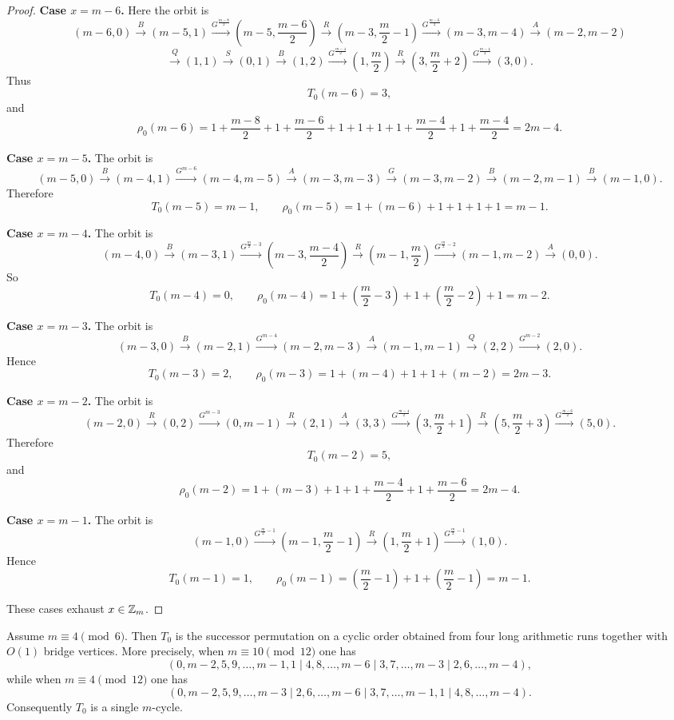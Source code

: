 \begin{proof}
\smallskip
\noindent\textbf{Case $x=m-6$.}
Here the orbit is
\[
(m-6,0)\xrightarrow{B}(m-5,1)
\xrightarrow{G^{\frac{m-8}{2}}}\left(m-5,\frac{m-6}{2}\right)\xrightarrow{R}\left(m-3,\frac m2-1\right)
\xrightarrow{G^{\frac{m-6}{2}}}(m-3,m-4)\xrightarrow{A}(m-2,m-2)
\]
\[
\xrightarrow{Q}(1,1)\xrightarrow{S}(0,1)\xrightarrow{B}(1,2)
\xrightarrow{G^{\frac{m-4}{2}}}\left(1,\frac m2\right)\xrightarrow{R}\left(3,\frac m2+2\right)
\xrightarrow{G^{\frac{m-4}{2}}}(3,0).
\]
Thus
\[
T_0(m-6)=3,
\]
and
\[
\rho_0(m-6)=
1+\frac{m-8}{2}+1+\frac{m-6}{2}+1+1+1+1+\frac{m-4}{2}+1+\frac{m-4}{2}
=
2m-4.
\]

\smallskip
\noindent\textbf{Case $x=m-5$.}
The orbit is
\[
(m-5,0)\xrightarrow{B}(m-4,1)\xrightarrow{G^{m-6}}(m-4,m-5)\xrightarrow{A}(m-3,m-3)
\xrightarrow{G}(m-3,m-2)\xrightarrow{B}(m-2,m-1)\xrightarrow{B}(m-1,0).
\]
Therefore
\[
T_0(m-5)=m-1,\qquad
\rho_0(m-5)=1+(m-6)+1+1+1+1=m-1.
\]

\smallskip
\noindent\textbf{Case $x=m-4$.}
The orbit is
\[
(m-4,0)\xrightarrow{B}(m-3,1)\xrightarrow{G^{\frac m2-3}}\left(m-3,\frac{m-4}{2}\right)
\xrightarrow{R}\left(m-1,\frac m2\right)\xrightarrow{G^{\frac m2-2}}(m-1,m-2)\xrightarrow{A}(0,0).
\]
So
\[
T_0(m-4)=0,\qquad
\rho_0(m-4)=1+\left(\frac m2-3\right)+1+\left(\frac m2-2\right)+1=m-2.
\]

\smallskip
\noindent\textbf{Case $x=m-3$.}
The orbit is
\[
(m-3,0)\xrightarrow{B}(m-2,1)\xrightarrow{G^{m-4}}(m-2,m-3)\xrightarrow{A}(m-1,m-1)
\xrightarrow{Q}(2,2)\xrightarrow{G^{m-2}}(2,0).
\]
Hence
\[
T_0(m-3)=2,\qquad
\rho_0(m-3)=1+(m-4)+1+1+(m-2)=2m-3.
\]

\smallskip
\noindent\textbf{Case $x=m-2$.}
The orbit is
\[
(m-2,0)\xrightarrow{R}(0,2)\xrightarrow{G^{m-3}}(0,m-1)\xrightarrow{R}(2,1)\xrightarrow{A}(3,3)
\xrightarrow{G^{\frac{m-4}{2}}}\left(3,\frac m2+1\right)\xrightarrow{R}\left(5,\frac m2+3\right)
\xrightarrow{G^{\frac{m-6}{2}}}(5,0).
\]
Therefore
\[
T_0(m-2)=5,
\]
and
\[
\rho_0(m-2)=1+(m-3)+1+1+\frac{m-4}{2}+1+\frac{m-6}{2}=2m-4.
\]

\smallskip
\noindent\textbf{Case $x=m-1$.}
The orbit is
\[
(m-1,0)\xrightarrow{G^{\frac m2-1}}\left(m-1,\frac m2-1\right)\xrightarrow{R}\left(1,\frac m2+1\right)
\xrightarrow{G^{\frac m2-1}}(1,0).
\]
Hence
\[
T_0(m-1)=1,\qquad
\rho_0(m-1)=\left(\frac m2-1\right)+1+\left(\frac m2-1\right)=m-1.
\]

These cases exhaust $x\in \mathbb Z_m$.
\end{proof}

\begin{proposition}\label{prop:R0-caseII-blocks}
Assume $m\equiv 4\pmod 6$.
Then $T_0$ is the successor permutation on a cyclic order obtained from four long arithmetic runs together with $O(1)$ bridge vertices.
More precisely, when $m\equiv 10\pmod{12}$ one has
\[
(0,m-2,5,9,\dots,m-1,1\mid 4,8,\dots,m-6\mid 3,7,\dots,m-3\mid 2,6,\dots,m-4),
\]
while when $m\equiv 4\pmod{12}$ one has
\[
(0,m-2,5,9,\dots,m-3\mid 2,6,\dots,m-6\mid 3,7,\dots,m-1,1\mid 4,8,\dots,m-4).
\]
Consequently $T_0$ is a single $m$-cycle.
\end{proposition}

